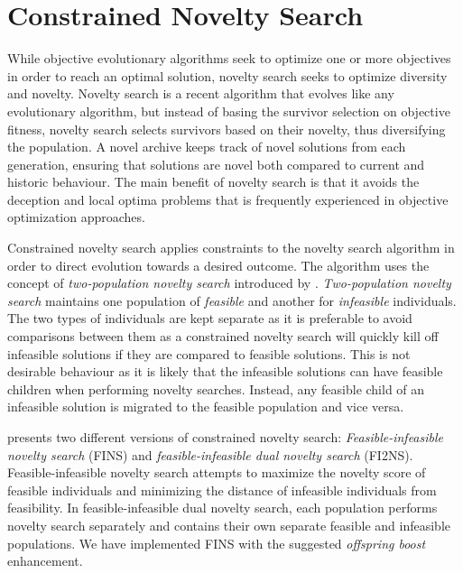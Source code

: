 \section{Constrained Novelty Search}
\label{methodology_csn}
While objective evolutionary algorithms seek to optimize one or more objectives in order to reach an optimal solution, novelty search seeks to optimize diversity and novelty. Novelty search is a recent algorithm that evolves like any evolutionary algorithm, but instead of basing the survivor selection on objective fitness, novelty search selects survivors based on their novelty, thus diversifying the population\cite{liapis2014constrained}. A novel archive keeps track of novel solutions from each generation, ensuring that solutions are novel both compared to current and historic behaviour. The main benefit of novelty search is that it avoids the deception and local optima problems that is frequently experienced in objective optimization approaches\cite{lehman2011abandoning}.

Constrained novelty search applies constraints to the novelty search algorithm in order to direct evolution towards a desired outcome\cite{liapis2014constrained}. The algorithm uses the concept of \textit{two-population novelty search} introduced by \citet{lehman2010revising}. \textit{Two-population novelty search} maintains one population of \textit{feasible} and another for \textit{infeasible} individuals. 
The two types of individuals are kept separate as it is preferable to avoid comparisons between them\cite{liapis2014constrained} as a constrained novelty search will quickly kill off infeasible solutions if they are compared to feasible solutions. This is not desirable behaviour as it is likely that the infeasible solutions can have feasible children when performing novelty searches. Instead, any feasible child of an infeasible solution is migrated to the feasible population and vice versa. 

\citet{liapis2014constrained} presents two different versions of constrained novelty search: \textit{Feasible-infeasible novelty search} (FINS) and \textit{feasible-infeasible dual novelty search} (FI2NS). Feasible-infeasible novelty search attempts to maximize the novelty score of feasible individuals and minimizing the distance of infeasible individuals from feasibility. In feasible-infeasible dual novelty search, each population performs novelty search separately and contains their own separate feasible and infeasible populations. We have implemented FINS with the suggested \textit{offspring boost} enhancement.

